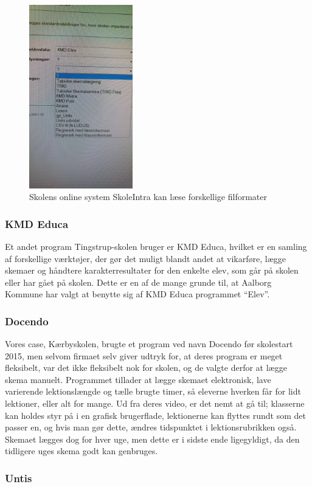 \begin{figure}[h!]
	\centering
	\includegraphics[width=0.4\textwidth]{../Billeder/Skemaimportering_filtyper_Intra.jpg}
	\caption{Skolens online system SkoleIntra kan læse forskellige filformater}
	\label{fig:kompatibleFiltyper}
\end{figure}
\FloatBarrier
\subsubsection{KMD Educa}
Et andet program Tingstrup-skolen bruger er KMD Educa, hvilket er en samling af forskellige værktøjer\cite{KMD}, der gør det muligt blandt andet at vikarføre, lægge skemaer og håndtere karakterresultater for den enkelte elev, som går på skolen eller har gået på skolen. Dette er en af de mange grunde til, at Aalborg Kommune har valgt at benytte sig af KMD Educa programmet ``Elev''\cite{useCase_KMD_Educa_Elev}.

\subsubsection{Docendo}
Vores case, Kærbyskolen, brugte et program ved navn Docendo før skolestart 2015, men selvom firmaet selv giver udtryk for, at deres program er meget fleksibelt\cite{Docendo}, var det ikke fleksibelt nok for skolen, og de valgte derfor at lægge skema manuelt. Programmet tillader at lægge skemaet elektronisk, lave varierende lektionslængde og tælle brugte timer, så eleverne hverken får for lidt lektioner, eller alt for mange. Ud fra deres video\cite{Docendo_video}, er det nemt at gå til; klasserne kan holdes styr på i en grafisk brugerflade, lektionerne kan flyttes rundt som det passer en, og hvis man gør dette, ændres tidspunktet i lektionsrubrikken også. Skemaet lægges dog for hver uge, men dette er i sidste ende ligegyldigt, da den tidligere uges skema godt kan genbruges.

\subsubsection{Untis}


